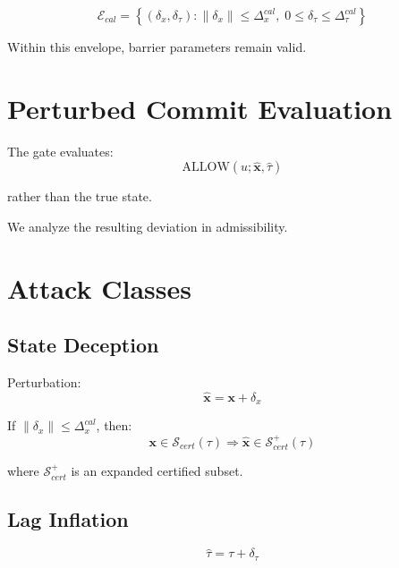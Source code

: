 \documentclass[letterpaper, 10 pt, conference]{ieeeconf}
\begin{document}
\begin{definition}
\begin{equation}
\mathcal{E}_{cal} =
\left\{
(\delta_x, \delta_\tau) :
\|\delta_x\| \le \Delta_x^{cal},\;
0 \le \delta_\tau \le \Delta_\tau^{cal}
\right\}
\end{equation}
\end{definition}

Within this envelope, barrier parameters remain valid.

\section{Perturbed Commit Evaluation}

The gate evaluates:
\begin{equation}
\text{ALLOW}(u;\hat{\mathbf{x}},\hat{\tau})
\end{equation}

rather than the true state.

We analyze the resulting deviation in admissibility.

\section{Attack Classes}

\subsection{State Deception}

Perturbation:
\begin{equation}
\hat{\mathbf{x}} = \mathbf{x} + \delta_x
\end{equation}

If $\|\delta_x\| \le \Delta_x^{cal}$, then:
\begin{equation}
\mathbf{x} \in \mathcal{S}_{cert}(\tau)
\Rightarrow
\hat{\mathbf{x}} \in \mathcal{S}_{cert}^+(\tau)
\end{equation}

where $\mathcal{S}_{cert}^+$ is an expanded certified subset.

\subsection{Lag Inflation}

\begin{equation}
\hat{\tau} = \tau + \delta_\tau
\end{equation}
\end{document}
